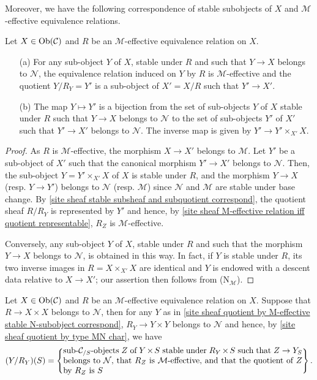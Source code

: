 Moreover, we have the following correspondence of stable subobjects of $X$ and $\mathcal{M}$-effective equivalence relations.
\begin{proposition}\label{site sheaf quotient by M-effective stable N-subobject correspond}
Let $X\in\mathrm{Ob}(\mathcal{C})$ and $R$ be an $\mathcal{M}$-effective equivalence relation on $X$.
\begin{enumerate}
    \item[(a)] For any sub-object $Y$ of $X$, stable under $R$ and such that $Y\to X$ belongs to $\mathcal{N}$, the equivalence relation induced on $Y$ by $R$ is $\mathcal{M}$-effective and the quotient $Y/R_Y=Y'$ is a sub-object of $X'=X/R$ such that $Y'\to X'$.
    \item[(b)] The map $Y\mapsto Y'$ is a bijection from the set of sub-objects $Y$ of $X$ stable under $R$ such that $Y\to X$ belongs to $\mathcal{N}$ to the set of sub-objects $Y'$ of $X'$ such that $Y'\to X'$ belongs to $\mathcal{N}$. The inverse map is given by $Y'\to Y'\times_{X'}X$.
\end{enumerate}
\end{proposition}
\begin{proof}
As $R$ is $\mathcal{M}$-effective, the morphism $X\to X'$ belongs to $\mathcal{M}$. Let $Y'$ be a sub-object of $X'$ such that the canonical morphism $Y'\to X'$ belongs to $\mathcal{N}$. Then, the sub-object $Y=Y'\times_{X'}X$ of $X$ is stable under $R$, and the morphism $Y\to X$ (resp. $Y\to Y'$) belongs to $\mathcal{N}$ (resp. $\mathcal{M}$) since $\mathcal{N}$ and $\mathcal{M}$ are stable under base change. By \cref{site sheaf stable subsheaf and subquotient correspond}, the quotient sheaf $R/R_Y$ is represented by $Y'$ and hence, by \cref{site sheaf M-effective relation iff quotient representable}, $R_Z$ is $\mathcal{M}$-effective.\par
Conversely, any sub-object $Y$ of $X$, stable under $R$ and such that the morphism $Y\to X$ belongs to $\mathcal{N}$, is obtained in this way. In fact, if $Y$ is stable under $R$, its two inverse images in $R=X\times_{X'}X$ are identical and $Y$ is endowed with a descent data relative to $X\to X'$; our assertion then follows from ($\text{N}_\mathcal{M}$).
\end{proof}

\begin{corollary}
Let $X\in\mathrm{Ob}(\mathcal{C})$ and $R$ be an $\mathcal{M}$-effective equivalence relation on $X$. Suppose that $R\to X\times X$ belongs to $\mathcal{N}$, then for any $Y$ as in \cref{site sheaf quotient by M-effective stable N-subobject correspond}, $R_Y\to Y\times Y$ belongs to $\mathcal{N}$ and hence, by \cref{site sheaf quotient by type MN char}, we have
\[(Y/R_Y)(S)=\left\{\parbox{4in}{%
sub-$\mathcal{C}_{/S}$-objects $Z$ of $Y\times S$ stable under $R_Y\times S$ such that $Z\to Y_S$ belongs to $\mathcal{N}$, that $R_Z$ is $\mathcal{M}$-effective, and that the quotient of $Z$ by $R_Z$ is $S$%
}\right\}.\]
\end{corollary}

